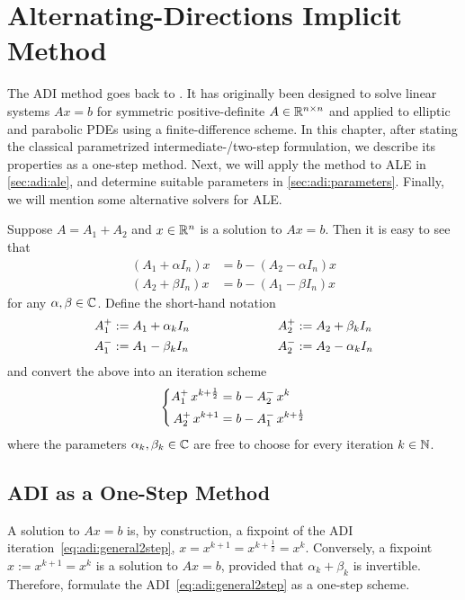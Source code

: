 \chapter{Alternating-Directions Implicit Method}

The \ac{ADI} method goes back to \cite{Peaceman1955}.
It has originally been designed to solve linear systems
$Ax=b$
for symmetric positive-definite $A\in\mathbb{R}^{n\times n}$
and applied to elliptic and parabolic \acp{PDE} using a finite-difference scheme.
In this chapter, after stating the classical parametrized intermediate-/two-step formulation,
we describe its properties as a one-step method.
Next, we will apply the method to \ac{ALE} in \autoref{sec:adi:ale},
and determine suitable parameters in \autoref{sec:adi:parameters}.
Finally, we will mention some alternative solvers for \ac{ALE}.

Suppose $A=A_1+A_2$ and $x\in\mathbb{R}^n$ is a solution to $Ax=b$.
Then it is easy to see that
\begin{align*}
  (A_1 + \alpha I_n)x &= b - (A_2 - \alpha I_n) x \\
  (A_2 + \beta I_n)x &= b - (A_1 - \beta I_n) x
\end{align*}
for any $\alpha, \beta \in\mathbb{C}$.
Define the short-hand notation
\begin{equation}
\label{eq:adi:shorthand}
\begin{aligned}
  \Aip  &:= A_1 + \alpha_k I_n &
  \qquad\qquad\qquad %
  \Aiip &:= A_2 + \beta_k  I_n \\
  \Aim  &:= A_1 - \beta_k  I_n &
  \Aiim &:= A_2 - \alpha_k I_n
\end{aligned}
\end{equation}
and convert the above into an iteration scheme
\begin{equation}
  \label{eq:adi:general2step}
  \left\{
  \begin{aligned}
    \mathop{A_1^+}  x^{k+\frac{1}{2}} &= b - \mathop{A_2^-} x^k \\
    \mathop{A_2^+} x^{k+1}           &= b - \mathop{A_1^-} x^{k+\frac{1}{2}}
  \end{aligned}
  \right.
\end{equation}
where the parameters $\alpha_k, \beta_k \in\mathbb{C}$ are free to choose for every iteration $k\in\mathbb{N}$.

\section{ADI as a One-Step Method}
\label{sec:adi:1step}

A solution to $Ax=b$ is, by construction, a fixpoint of the \ac{ADI} iteration~\eqref{eq:adi:general2step},
$x = x^{k+1} = x^{k+\frac{1}{2}} = x^k$.
Conversely, a fixpoint $\hat x := x^{k+1} = x^k$ is a solution to $Ax=b$,
provided that $\alpha_k + \beta_k$ is invertible.
Therefore, formulate the \ac{ADI}~\eqref{eq:adi:general2step} as a one-step scheme.

